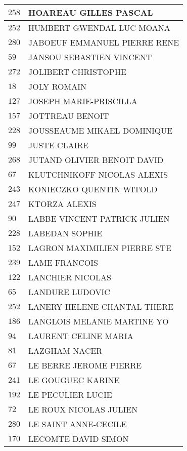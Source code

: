 \begin{xltabular}{\linewidth}{|l|X|}
    \hline
    $258$ & HOAREAU GILLES PASCAL \\
    \hline
    $252$ & HUMBERT GWENDAL LUC MOANA \\
    \hline
    $280$ & JABOEUF EMMANUEL PIERRE RENE \\
    \hline
    $59$ & JANSOU SEBASTIEN VINCENT \\
    \hline
    $272$ & JOLIBERT CHRISTOPHE \\
    \hline
    $18$ & JOLY ROMAIN \\
    \hline
    $127$ & JOSEPH MARIE-PRISCILLA \\
    \hline
    $157$ & JOTTREAU BENOIT \\
    \hline
    $228$ & JOUSSEAUME MIKAEL DOMINIQUE \\
    \hline
    $99$ & JUSTE CLAIRE \\
    \hline
    $268$ & JUTAND OLIVIER BENOIT DAVID \\
    \hline
    $67$ & KLUTCHNIKOFF NICOLAS ALEXIS \\
    \hline
    $243$ & KONIECZKO QUENTIN WITOLD \\
    \hline
    $247$ & KTORZA ALEXIS \\
    \hline
    $90$ & LABBE VINCENT PATRICK JULIEN \\
    \hline
    $228$ & LABEDAN SOPHIE \\
    \hline
    $152$ & LAGRON MAXIMILIEN PIERRE STE \\
    \hline
    $239$ & LAME FRANCOIS \\
    \hline
    $122$ & LANCHIER NICOLAS \\
    \hline
    $65$ & LANDURE LUDOVIC \\
    \hline
    $252$ & LANERY HELENE CHANTAL THERE \\
    \hline
    $186$ & LANGLOIS MELANIE MARTINE YO \\
    \hline
    $94$ & LAURENT CELINE MARIA \\
    \hline
    $81$ & LAZGHAM NACER \\
    \hline
    $67$ & LE BERRE JEROME PIERRE \\
    \hline
    $241$ & LE GOUGUEC KARINE \\
    \hline
    $192$ & LE PECULIER LUCIE \\
    \hline
    $72$ & LE ROUX NICOLAS JULIEN \\
    \hline
    $280$ & LE SAINT ANNE-CECILE \\
    \hline
    $170$ & LECOMTE DAVID SIMON \\

\end{xltabular}
